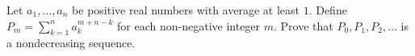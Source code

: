 Let $a_1,\ldots,a_n$ be positive real numbers with average at least $1$. Define $P_m=\displaystyle\sum_{k=1}^na_k^{m+n-k}$ for each non-negative integer $m$. Prove that $P_0,P_1,P_2,\ldots$ is a nondecreasing sequence.